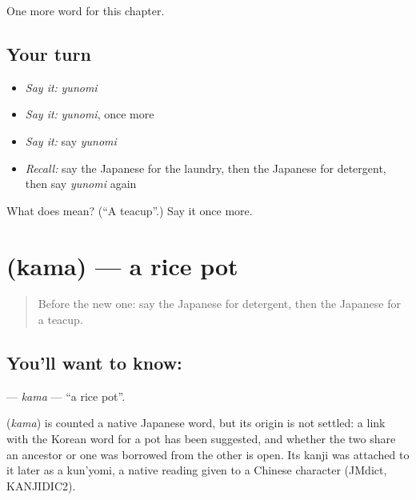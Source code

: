 \begin{grammarlens}[title={What you've built}]
One more word for this chapter.
\end{grammarlens}

\subsection*{Your turn}
\begin{itemize}
\raggedright
  \item \emph{Say it:} \emph{yunomi}
  \item \emph{Say it:} \emph{yunomi}, once more
  \item \emph{Say it:} say \emph{yunomi}
  \item \emph{Recall:} say the Japanese for the laundry, then the Japanese for detergent, then say \emph{yunomi} again
\end{itemize}

\begin{tcolorbox}[breakable,colback=teal!4,colframe=teal!35!black,title={Before you move on}]
What does  mean? (\textquotedblleft{}A teacup\textquotedblright{}.) Say it once more.
\end{tcolorbox}
\section[\texorpdfstring{\ja{かま} (kama)}{かま (kama)}]{ (kama) — a rice pot}

\label{lesson:JA-C102-kama}



\begin{quote}
Before the new one: say the Japanese for detergent, then the Japanese for a teacup.
\end{quote}

\subsection*{You'll want to know: }
\textbf{} — \emph{kama} — \textquotedblleft{}a rice pot\textquotedblright{}.

\begin{cousinweb}
\textbf{} (\emph{kama}) is counted a native Japanese word, but its origin is not settled: a link with the Korean word for a pot has been suggested, and whether the two share an ancestor or one was borrowed from the other is open. Its kanji was attached to it later as a kun'yomi, a native reading given to a Chinese character (JMdict, KANJIDIC2).
\end{cousinweb}

